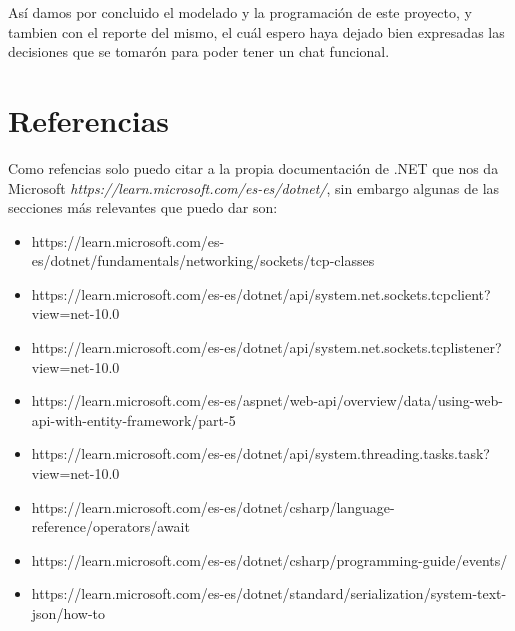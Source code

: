 \documentclass[10pt,letterpaper]{report}
\begin{document}
  \noindent Así damos por concluido el modelado y la programación de este proyecto, y tambien con el reporte del mismo, el cuál espero haya dejado bien expresadas las decisiones que se tomarón para poder tener un chat funcional.

  \chapter{Referencias}

    \noindent Como refencias solo puedo citar a la propia documentación de .NET que nos da Microsoft \textit{https://learn.microsoft.com/es-es/dotnet/}, sin embargo algunas de las secciones más relevantes que puedo dar son:
    \begin{itemize}
        \item [-] https://learn.microsoft.com/es-es/dotnet/fundamentals/networking/sockets/tcp-classes
        \item [-] https://learn.microsoft.com/es-es/dotnet/api/system.net.sockets.tcpclient?view=net-10.0
        \item [-] https://learn.microsoft.com/es-es/dotnet/api/system.net.sockets.tcplistener?view=net-10.0
        \item [-] https://learn.microsoft.com/es-es/aspnet/web-api/overview/data/using-web-api-with-entity-framework/part-5
        \item [-] https://learn.microsoft.com/es-es/dotnet/api/system.threading.tasks.task?view=net-10.0
        \item [-] https://learn.microsoft.com/es-es/dotnet/csharp/language-reference/operators/await
        \item[-] https://learn.microsoft.com/es-es/dotnet/csharp/programming-guide/events/
        \item [-] https://learn.microsoft.com/es-es/dotnet/standard/serialization/system-text-json/how-to
    \end{itemize}
    
    
    

    
    

\newpage



\vspace{1cm}
\end{document}
